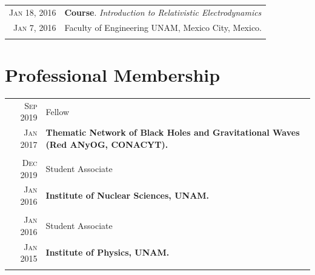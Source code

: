 \documentclass[a4paper,10pt]{article} %
\begin{document}
\begin{tabular}{r|p{11cm}}
	
	\textsc{Jan 18, 2016} & \small \textbf{Course}. \textit{Introduction to Relativistic Electrodynamics}\\
	\textsc{Jan 7, 2016} & \small Faculty of Engineering UNAM, Mexico City, Mexico.\\
	
	\multicolumn{2}{c}{} \\
	
\end{tabular}


\section{Professional Membership}
\bigskip
\begin{tabular}{r|l}
	\textsc{Sep 2019}& Fellow\\
	\textsc{Jan 2017}&\footnotesize{\textbf{Thematic Network of Black Holes and Gravitational Waves (Red ANyOG, CONACYT).}}\\
	\multicolumn{2}{c}{} \\
	\textsc{Dec 2019}& Student Associate\\
	\textsc{Jan 2016}&\footnotesize{\textbf{Institute of Nuclear Sciences, UNAM.}}\\
	\multicolumn{2}{c}{} \\
	\textsc{Jan 2016} & Student Associate\\
	\textsc{Jan 2015}&\footnotesize{\textbf{Institute of Physics, UNAM.}}\\
	\multicolumn{2}{c}{} \\
\end{tabular}

\end{document}
